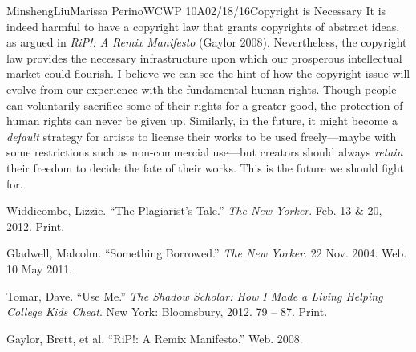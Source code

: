 \documentclass[12pt,letterpaper]{article}
\begin{document}
\begin{mla}{Minsheng}{Liu}{Marissa Perino}{WCWP 10A}{02/18/16}{Copyright is Necessary}
  It is indeed harmful to have a copyright law that grants copyrights of
  abstract ideas, as argued in \emph{RiP!: A Remix Manifesto} (Gaylor
  2008). Nevertheless, the copyright law provides the necessary
  infrastructure upon which our prosperous intellectual market could
  flourish. I believe we can see the hint of how the copyright issue will
  evolve from our experience with the fundamental human rights. Though
  people can voluntarily sacrifice some of their rights for a greater
  good, the protection of human rights can never be given up. Similarly,
  in the future, it might become a \emph{default} strategy for artists to
  license their works to be used freely---maybe with some restrictions
  such as non-commercial use---but creators should always \emph{retain}
  their freedom to decide the fate of their works. This is the future we
  should fight for.

\begin{workscited}
\bibent Widdicombe, Lizzie. ``The Plagiarist's Tale.'' \textit{The New Yorker}.
Feb. 13 \& 20, 2012. Print.

\bibent Gladwell, Malcolm. ``Something Borrowed.'' \textit{The New Yorker}.
22 Nov. 2004. Web. 10 May 2011.

\bibent Tomar, Dave. ``Use Me.'' \textit{The Shadow Scholar: How I Made a Living
  Helping College Kids Cheat}.
New York: Bloomsbury, 2012. 79 -- 87. Print.

\bibent Gaylor, Brett, et al. ``RiP!: A Remix Manifesto.'' Web. 2008.
\end{workscited}
\end{mla}
\end{document}

